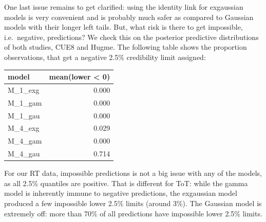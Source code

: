 \documentclass[]{svmono}
\newenvironment{Shaded}{\begin{snugshade}}{\end{snugshade}}
\newcommand{\KeywordTok}[1]{\textcolor[rgb]{0.13,0.29,0.53}{\textbf{#1}}}
\newcommand{\DecValTok}[1]{\textcolor[rgb]{0.00,0.00,0.81}{#1}}
\newcommand{\StringTok}[1]{\textcolor[rgb]{0.31,0.60,0.02}{#1}}
\newcommand{\OperatorTok}[1]{\textcolor[rgb]{0.81,0.36,0.00}{\textbf{#1}}}
\newcommand{\NormalTok}[1]{#1}
\begin{document}
One last issue remains to get clarified: using the identity link for
exgaussian models is very convenient and is probably much safer as
compared to Gaussian models with their longer left tails. But, what risk
is there to get impossible, i.e.~negative, predictions? We check this on
the posterior predictive distributions of both studies, CUE8 and Hugme.
The following table shows the proportion observations, that get a
negative 2.5\% credibility limit assigned:

\begin{Shaded}
\end{Shaded}

\begin{tabular}{l|r}
\hline
model & mean(lower < 0)\\
\hline
M\_1\_exg & 0.000\\
\hline
M\_1\_gam & 0.000\\
\hline
M\_1\_gau & 0.000\\
\hline
M\_4\_exg & 0.029\\
\hline
M\_4\_gam & 0.000\\
\hline
M\_4\_gau & 0.714\\
\hline
\end{tabular}

For our RT data, impossible predictions is not a big issue with any of
the models, as all 2.5\% quantiles are positive. That is different for
ToT: while the gamma model is inherently immune to negative predictions,
the exgaussian model produced a few impossible lower 2.5\% limits
(around 3\%). The Gaussian model is extremely off: more than 70\% of all
predictions have impossible lower 2.5\% limits.
\end{document}
